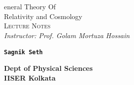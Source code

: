 \documentclass{scrartcl}
\begin{document}
\makeatletter
\begin{titlepage}
    \vspace*{2cm}
    
        \begin{center}
            {\rmfamily
                \Huge{\textcolor{blue!30!black}{%
                    \textmd{{}}eneral {\HUGE T}heory {\HUGE O}f\\
                     {\HUGE R}elativity and {\HUGE C}osmology%
                }}\\[0.7cm]
                
                
                \Large \textsc{Lecture Notes} \\[0.3cm]
               \Large \textit{Instructor: Prof. Golam Mortuza Hossain }\\[1.5cm]

            }
            \end{center}
       
        \begin{figure}[H]
            \centering
            
        \end{figure}
        \vspace{1cm}
        \begin{center}
           \Large \texttt{\textbf{{\LARGE  S}agnik {\LARGE S}eth }}
        \end{center}
        \vspace{0.5cm}
      \begin{center}
    \textbf{ Dept of Physical Sciences} \\
    \textbf{IISER Kolkata}
    \vspace{0.5cm}

   
\end{center}

\end{titlepage}

  
       
\tableofcontents
\newpage


% 
% 
% 
% 
% 
\end{document}
